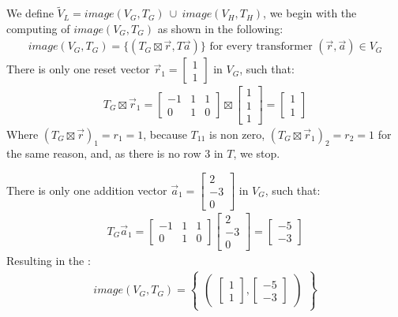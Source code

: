We define $\tilde{V}_L = image(V_G, T_G)\ \cup\ image(V_H, T_H)$, we begin with the computing of $image(V_G, T_G)$ as shown in the following:
\begin{align*}
	image(V_G, T_G) = \{(T_G\boxtimes\vec{r}, T\vec{a})\} \text{ for every transformer } (\vec{r}, \vec{a}) \in V_G
\end{align*}
There is only one reset vector $\vec{r}_1 = \begin{bmatrix}1 \\ 1 \end{bmatrix}$ in $V_G$, such that:
\begin{align*}
	T_G\boxtimes\vec{r}_1 = \begin{bmatrix}  -1 & 1 & 1 \\ 0 & 1 & 0\end{bmatrix} \boxtimes \begin{bmatrix} 1 \\ 1 \\ 1\end{bmatrix} = \begin{bmatrix}  1 \\ 1\end{bmatrix}
\end{align*}
Where $(T_G\boxtimes\vec{r})_1 = r_1 = 1$, because $T_{11}$ is non zero, $(T_G\boxtimes\vec{r}_1)_2 = r_2 = 1$ for the same reason, and, as there is no row 3 in $T$, we stop. \\ \par
There is only one addition vector $\vec{a}_1 =  \begin{bmatrix}2 \\ -3 \\ 0\end{bmatrix}$ in $V_G$, such that:
\begin{align*}
	T_G\vec{a}_1 = \begin{bmatrix}  -1 & 1 & 1 \\ 0 & 1 & 0\end{bmatrix} \begin{bmatrix} 2 \\ -3 \\ 0\end{bmatrix} = \begin{bmatrix} -5 \\ -3 \end{bmatrix}
\end{align*}
Resulting in the \qvasr:
\begin{align*}
	image(V_G, T_G) = 
	\begin{Bmatrix}
		\begin{pmatrix}
			\begin{bmatrix}
				1 \\
				1 
			\end{bmatrix},
			\begin{bmatrix}
				-5 \\
				-3 
			\end{bmatrix}
		\end{pmatrix}
	\end{Bmatrix}
\end{align*} \par
